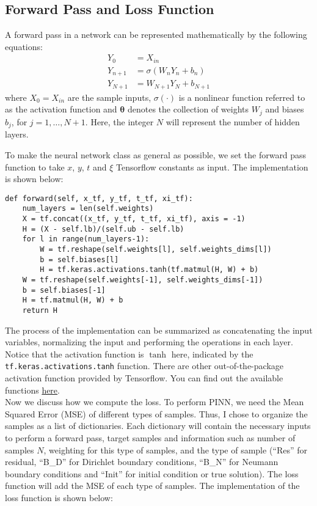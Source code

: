 \documentclass{article}
\newcommand{\btheta}{\bm{\theta}}
\begin{document}
\subsection{Forward Pass and Loss Function}
A forward pass in a network can be represented mathematically by the following equations:
\begin{equation}
\begin{split}
Y_0 &= X_{in}\\
Y_{n+1} &= \sigma(W_nY_n+b_n)\\
Y_{N+1} &= W_{N+1}Y_{N}+b_{N+1}
\end{split}
\label{eq:nn}
\end{equation}
where $X_0 = X_{in}$ are the sample inputs, $\sigma(\cdot)$ is a nonlinear function referred to as the activation function and $\btheta$ denotes the collection of weights $W_{j}$ and biases $b_j$, for $j = 1,\dots, N+1$. Here, the integer $N$ will represent the number of hidden layers. 

To make the neural network class as general as possible, we set the forward pass function to take $x$, $y$, $t$ and $\xi$ Tensorflow constants as input. The implementation is shown below:
\begin{lstlisting}
def forward(self, x_tf, y_tf, t_tf, xi_tf):
	num_layers = len(self.weights) 
	X = tf.concat((x_tf, y_tf, t_tf, xi_tf), axis = -1)
	H = (X - self.lb)/(self.ub - self.lb)
	for l in range(num_layers-1):
		W = tf.reshape(self.weights[l], self.weights_dims[l])
		b = self.biases[l]
		H = tf.keras.activations.tanh(tf.matmul(H, W) + b)	
	W = tf.reshape(self.weights[-1], self.weights_dims[-1])
	b = self.biases[-1]
	H = tf.matmul(H, W) + b
	return H
\end{lstlisting}
The process of the implementation can be summarized as concatenating the input variables, normalizing the input and performing the operations in each layer. Notice that the activation function is $\tanh$ here, indicated by the \texttt{tf.keras.activations.tanh} function. There are other out-of-the-package activation function provided by Tensorflow. You can find out the available functions \href{https://www.tensorflow.org/api_docs/python/tf/keras/activations}{here}. \\

Now we discuss how we compute the loss. To perform PINN, we need the Mean Squared Error (MSE) of different types of samples. Thus, I chose to organize the samples as a list of dictionaries. Each dictionary will contain the necessary inputs to perform a forward pass, target samples and information such as number of samples $N$, weighting for this type of samples, and the type of sample (``Res'' for residual, ``B\_D'' for Dirichlet boundary conditions, ``B\_N'' for Neumann boundary conditions and ``Init'' for initial condition or true solution). The loss function will add the MSE of each type of samples. The implementation of the loss function is shown below:
\end{document}
